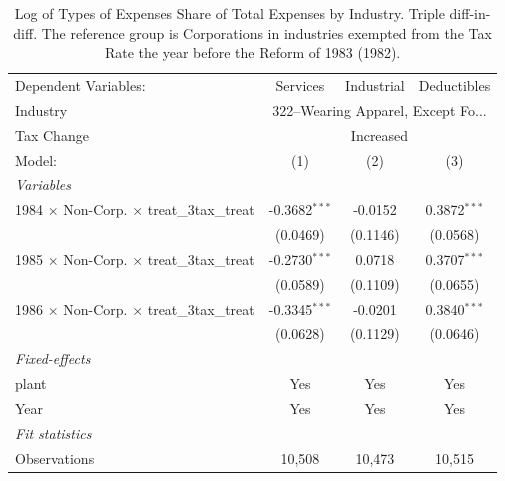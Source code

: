 \documentclass[
  12pt]{article}
\theoremstyle{definition}
\theoremstyle{remark}
\begin{document}
\begin{table}

\caption{\label{tbl-reg-exp-inds}Log of Types of Expenses Share of Total
Expenses by Industry. Triple diff-in-diff. The reference group is
Corporations in industries exempted from the Tax Rate the year before
the Reform of 1983 (1982).}

\begin{minipage}{\linewidth}

\begingroup
\centering
\begin{tabular}{lccc}
   \tabularnewline \midrule \midrule
   Dependent Variables:                                    & Services        & Industrial & Deductibles\\  
   Industry & \multicolumn{3}{c}{322–Wearing Apparel, Except Fo...} \\ 
   Tax Change & \multicolumn{3}{c}{Increased} \\ 
   Model:                                                  & (1)             & (2)        & (3)\\  
   \midrule
   \emph{Variables}\\
   1984 $\times$ Non-Corp. $\times$ treat\_3tax\_treat     & -0.3682$^{***}$ & -0.0152    & 0.3872$^{***}$\\   
                                                           & (0.0469)        & (0.1146)   & (0.0568)\\   
   1985 $\times$ Non-Corp. $\times$ treat\_3tax\_treat     & -0.2730$^{***}$ & 0.0718     & 0.3707$^{***}$\\   
                                                           & (0.0589)        & (0.1109)   & (0.0655)\\   
   1986 $\times$ Non-Corp. $\times$ treat\_3tax\_treat     & -0.3345$^{***}$ & -0.0201    & 0.3840$^{***}$\\   
                                                           & (0.0628)        & (0.1129)   & (0.0646)\\   
   \midrule
   \emph{Fixed-effects}\\
   plant                                                   & Yes             & Yes        & Yes\\  
   Year                                                    & Yes             & Yes        & Yes\\  
   \midrule
   \emph{Fit statistics}\\
   Observations                                            & 10,508          & 10,473     & 10,515\\  

\end{tabular}
\end{minipage}
\end{table}
\end{document}
